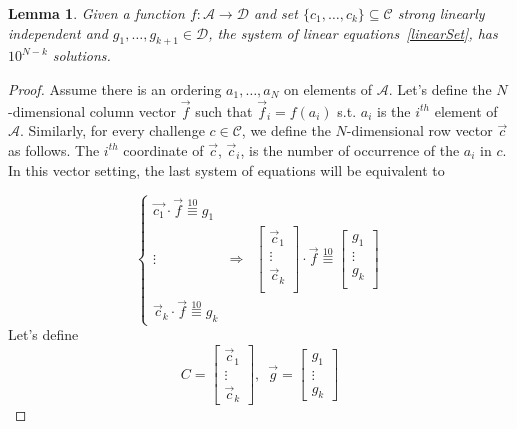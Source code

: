 \documentclass{article}
\newtheorem{lemma}[theorem]{Lemma}
\begin{document}
\begin{lemma}
\label{lem:linearIndep}
	Given a function $f:\mathcal{A}\to \mathcal{D}$ and set $\{c_1,\ldots,c_k\} \subseteq \mathcal{C}$ strong linearly independent and $g_1,\ldots,g_{k+1}\in\mathcal{D}$, the system of linear equations~\ref{linearSet}, has $10^{N-{k}}$ solutions. 
\end{lemma}	
\begin{proof}
Assume there is an ordering $a_1,\ldots,a_N$ on elements of $\mathcal{A}$. Let's define the $N$-dimensional column vector $\vec{f}$ such that $\vec{f}_i=f(a_i)$ s.t. $a_i$ is the $i^{th}$ element of $\mathcal{A}$. Similarly, for every challenge $c\in\mathcal{C}$, we define the $N$-dimensional row vector $\vec{c}$ as follows. The $i^{th}$ coordinate of $\vec{c}$, $\vec{c}_i$, is the number of occurrence of the $a_i$ in $c$. In this vector setting, the last system of equations will be equivalent to 


	\begin{equation}
	\label{eq:matrix}
	\left\{ \begin{array}{lcr}
     \vec{c_1}\cdot \vec{f} \overset{10}{\equiv} g_1 &  \\
     \vdots  & \Rightarrow &  
     
     \left[ \begin{array}{l}
     \vec{c}_1 \\
     \vdots \\
     \vec{c}_{k} \\
     \end{array}
     \right]     \cdot\vec{f}\overset{10}{\equiv}
     
     \left[ \begin{array}{l}
     {g}_1 \\
     \vdots \\
     {g}_{k} \\
     \end{array}
     \right]     
      \\
     
     \vec{c}_{k}\cdot \vec{f} \overset{10}{\equiv} g_{k} & &
    \end{array} \right.
    \end{equation}
   	Let's define
   	$$
     C= \left[ \begin{array}{l}
     \vec{c}_1 \\
     \vdots \\
     \vec{c}_{k}
	 \end{array}\right] 
	 ,\,\,\, \vec{g} = 
	 \left[
	 \begin{array}{l}
	 	g_1\\
	    \vdots \\
	 	g_k
	 \end{array}
	 \right] 
   	$$
   	

\end{proof}
\end{document}
